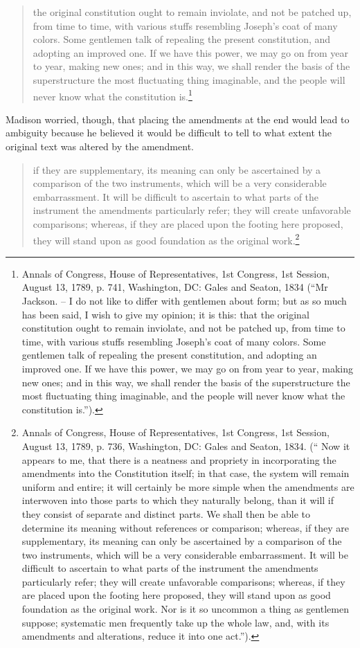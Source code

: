 \begin{quote}
the original constitution ought to remain inviolate, and not be patched up, from time to time, with various stuffs resembling Joseph's coat of many colors.  Some gentlemen talk of repealing the present constitution, and adopting an improved one. If we have this power, we may go on from year to year, making new ones; and in this way, we shall render the basis of the superstructure the most fluctuating thing imaginable, and the people will never know what the constitution is.\footnote{Annals of Congress, House of Representatives, 1st Congress, 1st Session, August 13, 1789, p. 741, Washington, DC:  Gales and Seaton, 1834 (``Mr Jackson. -- I do not like to differ with gentlemen about form; but as so much has been said, I wish to give my opinion; it is this: that the original constitution ought to remain inviolate, and not be patched up, from time to time, with various stuffs resembling Joseph's coat of many colors.
Some gentlemen talk of repealing the present constitution, and adopting an improved one. If we have this power, we may go on from year to year, making new ones; and in this way, we shall render the basis of the superstructure the most fluctuating thing imaginable, and the people will never know what the constitution is.'').}
\end{quote}

Madison worried, though, that placing the amendments at the end would lead to ambiguity because he believed it would be difficult to tell to what extent the original text was altered by the amendment.

\begin{quote}
if they are supplementary, its meaning can only be ascertained by a comparison of the two instruments, which will be a very considerable embarrassment. It will be difficult to ascertain to what parts of the instrument the amendments particularly refer; they will create unfavorable comparisons; whereas, if they are placed upon the footing here proposed, they will stand upon as good foundation as the original work.\footnote{Annals of Congress, House of Representatives, 1st Congress, 1st Session, August 13, 1789, p. 736, Washington, DC:  Gales and Seaton, 1834. (`` Now it appears to me, that there is a neatness and propriety in incorporating the amendments into the Constitution itself; in that case, the system will remain uniform and entire; it will certainly be more simple when the amendments are interwoven into those parts to which they naturally belong, than it will if they consist of separate and distinct parts. We shall then be able to determine its meaning without references or comparison; whereas, if they are supplementary, its meaning can only be ascertained by a comparison of the two instruments, which will be a very considerable embarrassment. It will be difficult to ascertain to what parts of the instrument the amendments particularly refer; they will create unfavorable comparisons; whereas, if they are placed upon the footing here proposed, they will stand upon as good foundation as the original work. Nor is it so uncommon a thing as gentlemen suppose; systematic men frequently take up the whole law, and, with its amendments and alterations, reduce it into one act.'').}  
\end{quote}

